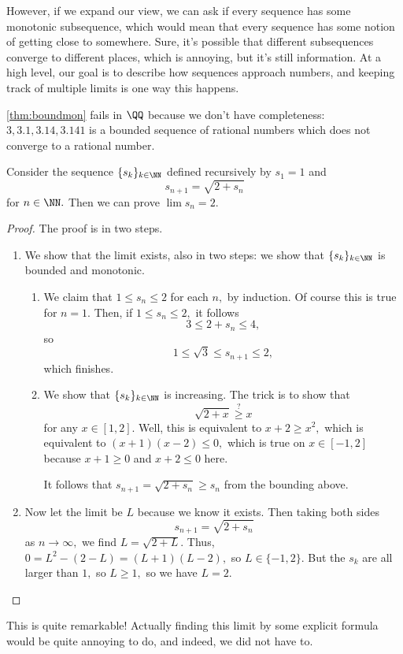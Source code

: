 However, if we expand our view, we can ask if every sequence has some monotonic subsequence, which would mean that every sequence has some notion of getting close to somewhere. Sure, it's possible that different subsequences converge to different places, which is annoying, but it's still information. At a high level, our goal is to describe how sequences approach numbers, and keeping track of multiple limits is one way this happens.
\begin{remark}
	\autoref{thm:boundmon} fails in $\QQ$ because we don't have completeness: $3,3.1,3.14,3.141$ is a bounded sequence of rational numbers which does not converge to a rational number.
\end{remark}
\begin{exercise}
	Consider the sequence $\{s_k\}_{k\in\NN}$ defined recursively by $s_1=1$ and
	\[s_{n+1}=\sqrt{2+s_n}\]
	for $n\in\NN.$ Then we can prove $\lim s_n=2.$
\end{exercise}
\begin{proof}
	The proof is in two steps.
	\begin{enumerate}
		\item We show that the limit exists, also in two steps: we show that $\{s_k\}_{k\in\NN}$ is bounded and monotonic.
		\begin{enumerate}
			\item We claim that $1\le s_n\le 2$ for each $n,$ by induction. Of course this is true for $n=1.$ Then, if $1\le s_n\le 2,$ it follows
			\[3\le2+s_n\le4,\]
			so
			\[1\le\sqrt3\le s_{n+1}\le2,\]
			which finishes.
			\item We show that $\{s_k\}_{k\in\NN}$ is increasing. The trick is to show that
			\[\sqrt{2+x}\stackrel?\ge x\]
			for any $x\in[1,2].$ Well, this is equivalent to $x+2\ge x^2,$ which is equivalent to $(x+1)(x-2)\le0,$ which is true on $x\in[-1,2]$ because $x+1\ge0$ and $x+2\le0$ here.

			It follows that $s_{n+1}=\sqrt{2+s_n}\ge s_n$ from the bounding above.
		\end{enumerate}
		\item Now let the limit be $L$ because we know it exists. Then taking both sides
		\[s_{n+1}=\sqrt{2+s_n}\]
		as $n\to\infty,$ we find $L=\sqrt{2+L}.$ Thus, $0=L^2-(2-L)=(L+1)(L-2),$ so $L\in\{-1,2\}.$ But the $s_k$ are all larger than $1,$ so $L\ge1,$ so we have $\boxed{L=2}.$
		\qedhere
	\end{enumerate}
\end{proof}
\begin{remark}
	This is quite remarkable! Actually finding this limit by some explicit formula would be quite annoying to do, and indeed, we did not have to.
\end{remark}
